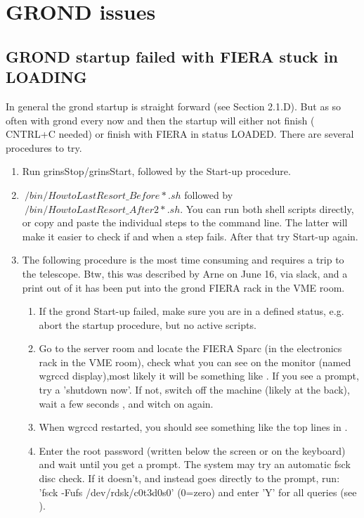 \documentclass[11pt,fleqn,a4paper]{book}
\begin{document}
 
\section{GROND issues}

\subsection{GROND startup failed with FIERA stuck in LOADING}
 In general the \gls{grond} startup is straight forward (see Section 2.1.D). But as so often with \gls{grond} every now and then the startup will either not finish ( CNTRL+C needed) or finish with FIERA in status LOADED. There are several procedures to try.
 
 \begin{enumerate}
 	\item Run grinsStop/grinsStart, followed by the Start-up procedure.
 	\item $~/bin/HowtoLastResort\_Before*.sh$ followed by  $~/bin/HowtoLastResort\_After2*.sh$. You can run both shell scripts directly, or  copy and paste the individual steps to the command line. The latter will make it easier to check if and when a step fails. After that try Start-up again.\\
 	\item The following procedure is the most time consuming and requires a trip to the telescope. Btw, this was described by Arne on June 16, via  slack, and a print out of it has been put into the \gls{grond} FIERA rack in the VME room.
 		\begin{enumerate}
 			\item If the \gls{grond} Start-up failed, make sure you are in a defined status, e.g. abort the startup procedure, but no active scripts.
 			\item Go to the server room and locate the FIERA Sparc (in the electronics rack in the VME room), check what you can see on the monitor (named wgrccd display),most likely it will be something like . If you see a prompt, try a 'shutdown now'. If not, switch off the machine (likely at the back), wait a few seconds , and witch on again.
 			\item When wgrccd restarted, you should see something like the top lines in .
 			\item Enter the root password (written below the screen or on the keyboard) and wait until you get a prompt.  The system may try an automatic fsck disc check. If it doesn't, and instead goes directly to the prompt, run: 'fsck -Fufs /dev/rdsk/c0t3d0s0' (0=zero) and enter 'Y' for all queries (see ).

\end{enumerate}
\end{enumerate}
\end{document}
